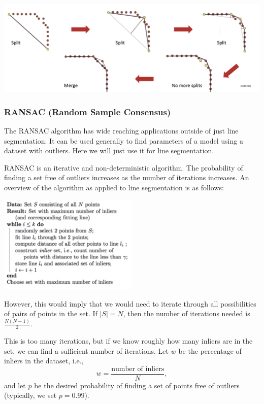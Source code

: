 \documentclass[twoside]{article}
\begin{document}
\begin{center}
	\includegraphics[width=1\textwidth]{iterativesplit}
\end{center}

\subsubsection{RANSAC (Random Sample Consensus)}
The RANSAC algorithm has wide reaching applications outside of just line segmentation. It can be used generally to find parameters of a model using a dataset with outliers. Here we will just use it for line segmentation.

RANSAC is an iterative and non-deterministic algorithm. The probability of finding a set free of outliers increases as the number of iterations increases. An overview of the algorithm as applied to line segmentation is as follows:
\begin{center}
	\includegraphics[width=0.5\textwidth]{RANSACOverview}
\end{center}

However, this would imply that we would need to iterate through all possibilities of pairs of points in the set. If $|S| = N$, then the number of iterations needed is
$\frac{N(N-1)}{2}.$

This is too many iterations, but if we know roughly how many inliers are in the set, we can find a sufficient number of iterations. Let $w$ be the percentage of inliers in the dataset, i.e.,
$$w = \frac{\text{number of inliers}}{N},$$
and let $p$ be the desired probability of finding a set of points free of outliers (typically, we set $p=0.99$). 
\end{document}
